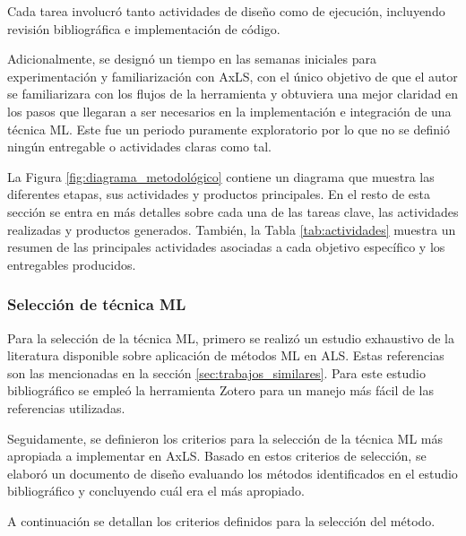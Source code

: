 Cada tarea involucró tanto actividades de diseño como de ejecución, incluyendo
revisión bibliográfica e implementación de código.

Adicionalmente, se designó un tiempo en las semanas iniciales para
experimentación y familiarización con AxLS, con el único objetivo de que el
autor se familiarizara con los flujos de la herramienta y obtuviera una mejor
claridad en los pasos que llegaran a ser necesarios en la implementación e
integración de una técnica ML.
Este fue un periodo puramente exploratorio por lo que no se definió ningún
entregable o actividades claras como tal.


La Figura \ref{fig:diagrama_metodológico} contiene un diagrama que muestra las
diferentes etapas, sus actividades y productos principales.
En el resto de esta sección se entra en más detalles sobre cada una de las tareas clave, las
actividades realizadas y productos generados.
También, la Tabla \ref{tab:actividades} muestra un resumen de las principales actividades asociadas a
cada objetivo específico y los entregables producidos.

\subsubsection{Selección de técnica ML}

Para la selección de la técnica ML, primero se realizó un estudio exhaustivo
de la literatura disponible sobre aplicación de métodos ML en ALS. Estas
referencias son las mencionadas en la sección \ref{sec:trabajos_similares}.
Para este estudio bibliográfico se empleó la herramienta Zotero para un manejo
más fácil de las referencias utilizadas.

Seguidamente, se definieron los criterios para la selección de la técnica ML
más apropiada a implementar en AxLS. Basado en estos criterios de selección, se
elaboró un documento de diseño evaluando los métodos identificados en el
estudio bibliográfico y concluyendo cuál era el más apropiado.

A continuación se detallan los criterios definidos para la selección del método.

